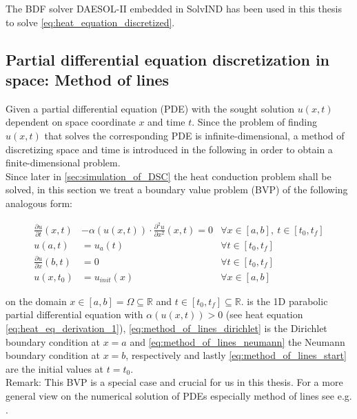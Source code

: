 \documentclass{scrartcl}[12pt, halfparskip]
\numberwithin{equation}{section}
\numberwithin{figure}{section}
\numberwithin{table}{section}
\begin{document}
The BDF solver DAESOL-II embedded in SolvIND has been used in this thesis to solve \cref{eq:heat_equation_discretized}.






\subsection{Partial differential equation discretization in space: Method of lines}
\label{sec:pde_discretization}


Given a partial differential equation (PDE) with the sought solution $u(x,t)$ dependent on space coordinate $x$ and time $t$. Since the problem of finding $u(x,t)$ that solves the corresponding PDE is infinite-dimensional, a method of discretizing space and time is introduced in the following in order to obtain a finite-dimensional problem. \\
Since later in \cref{sec:simulation_of_DSC} the heat conduction problem shall be solved, in this section we treat a boundary value problem (BVP) of the following analogous form:

\begin{subequations}
	\begin{align}
	\frac{\partial u}{\partial t}(x,t) & - \alpha(u(x,t)) \cdot \frac{\partial^2 u}{\partial x^2}(x,t) = 0 & \forall x \in [a,b], \ t \in [t_0,t_f] \label{eq:method_of_lines_pde} \\
	u(a,t) & = u_a(t)  & \forall t \in [t_0,t_f] \label{eq:method_of_lines_dirichlet} \\
	\frac{\partial u}{\partial x}(b,t) & = 0  & \forall t \in [t_0,t_f] \label{eq:method_of_lines_neumann}  \\
	u(x,t_0) & = u_{init}(x) & \forall x \in [a,b] \label{eq:method_of_lines_start}
	\end{align}
	\label{eq:method_of_lines}
\end{subequations}

on the domain $x \in [a,b] = \Omega \subseteq \mathbb{R}$ and $t \in [t_0,t_f] \subseteq \mathbb{R}$.  is the 1D parabolic partial differential equation with $\alpha(u(x,t)) > 0$ (see heat equation \eqref{eq:heat_eq_derivation_1}), \cref{eq:method_of_lines_dirichlet} is the Dirichlet boundary condition at $x=a$ and \cref{eq:method_of_lines_neumann} the Neumann boundary condition at $x=b$, respectively and lastly \cref{eq:method_of_lines_start} are the initial values at ${t=t_0}$. \\
Remark: This BVP is a special case and crucial for us in this thesis. For a more general view on the numerical solution of PDEs especially method of lines see e.g. \cite{pde_buch_solin}. \\
\end{document}
